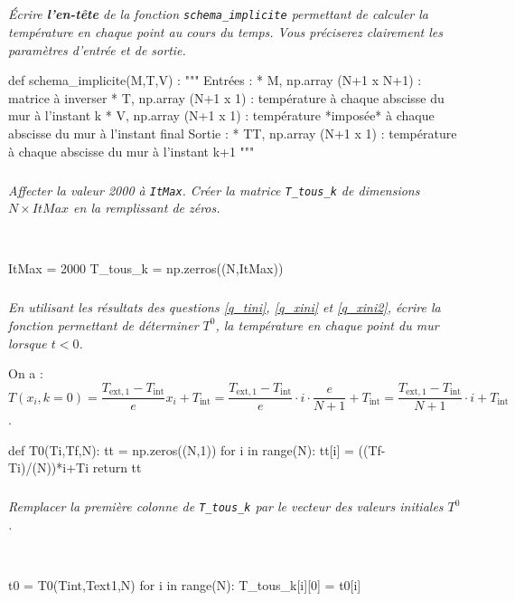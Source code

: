 \documentclass[10pt,fleqn]{article} %
\begin{document}
\subparagraph{\label{q_solve}}
\textit{Écrire \textbf{l'en-tête} de la fonction \texttt{schema\_implicite} permettant de calculer la température en chaque point au cours du temps. Vous préciserez clairement les paramètres d'entrée et de sortie.}
\ifprof
\begin{corrige}
\begin{python}
def schema_implicite(M,T,V) :
    """
    Entrées : 
        * M, np.array (N+1 x N+1) : matrice à inverser
        * T, np.array (N+1 x 1) : température à chaque abscisse du mur à l'instant k
        * V, np.array (N+1 x 1) : température *imposée* à chaque abscisse du mur à l'instant final
    Sortie : 
        * TT, np.array (N+1 x 1) : température à chaque abscisse du mur à l'instant k+1
    """
\end{python}
\end{corrige}
\else
\fi

\subparagraph{}
\textit{Affecter la valeur 2000 à  \texttt{ItMax}. Créer la matrice  \texttt{T\_tous\_k}  de dimensions $N\times ItMax$ en la remplissant de zéros.}
\ifprof
\begin{corrige}
~\\
\begin{python}
ItMax = 2000
T_tous_k = np.zerros((N,ItMax))
\end{python}
\end{corrige}
\else
\fi


\subparagraph{}
\textit{En utilisant les résultats des questions \ref{q_tini}, \ref{q_xini} et \ref{q_xini2}, écrire la fonction permettant de déterminer $T^0$, la température en chaque point du mur lorsque $t<0$. }
\ifprof
\begin{corrige} 
On a : $T(x_i,k=0)=\dfrac{T_{\text{ext},1}-T_{\text{int}}}{e}x_i + T_{\text{int}} = \dfrac{T_{\text{ext},1}-T_{\text{int}}}{e}\cdot i \cdot \dfrac{e}{N+1} + T_{\text{int}} =  \dfrac{T_{\text{ext},1}-T_{\text{int}}}{N+1}\cdot i  + T_{\text{int}}$.
~\\
\begin{python}
def T0(Ti,Tf,N):
    tt =  np.zeros((N,1))
    for i in range(N):
        tt[i] = ((Tf-Ti)/(N))*i+Ti
    return tt
\end{python}
\end{corrige}
\else
\fi



\subparagraph{}
\textit{Remplacer la première colonne de \texttt{T\_tous\_k} par le vecteur des valeurs initiales $T^0$. }
\ifprof
\begin{corrige}~\\

\begin{python}
t0 = T0(Tint,Text1,N)
for i in range(N):
    T_tous_k[i][0] = t0[i]
\end{python}
\end{corrige}
\else
\fi
\end{document}
